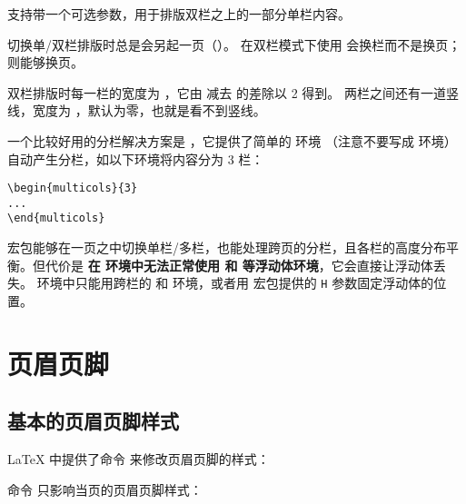  支持带一个可选参数，用于排版双栏之上的一部分单栏内容。

切换单/双栏排版时总是会另起一页（）。
在双栏模式下使用  会换栏而不是换页； 则能够换页。

双栏排版时每一栏的宽度为 ，它由  减去  的差除以 2 得到。
两栏之间还有一道竖线，宽度为 ，默认为零，也就是看不到竖线。

一个比较好用的分栏解决方案是 ，它提供了简单的  环境
（注意不要写成  环境）自动产生分栏，如以下环境将内容分为 3 栏：
\begin{verbatim}
\begin{multicols}{3}
...
\end{multicols}
\end{verbatim}

 宏包能够在一页之中切换单栏/多栏，也能处理跨页的分栏，且各栏的高度分布平衡。但代价是%
\textbf{在  环境中无法正常使用  和  等浮动体环境}，它会直接让浮动体丢失。
 环境中只能用跨栏的  和  环境，或者用  宏包提供的 \texttt{H} 参数固定浮动体的位置。

\section{页眉页脚}\label{sec:pagestyle}

\subsection{基本的页眉页脚样式}\label{subsec:basic-pagesyle}

\LaTeX{} 中提供了命令  来修改页眉页脚的样式：
\begin{command}
\end{command}

命令  只影响当页的页眉页脚样式：
\begin{command}
\end{command}

